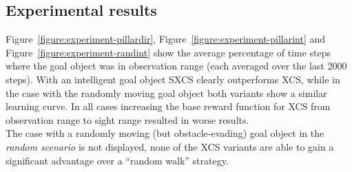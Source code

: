 
\subsection{Experimental results}\label{subsection:experimental_results}




Figure~\ref{figure:experiment-pillardir}, Figure~\ref{figure:experiment-pillarint} and Figure~\ref{figure:experiment-randint} show the average percentage of time steps where the goal object was in observation range (each averaged over the last 2000 steps). With an intelligent goal object SXCS clearly outperforms XCS, while in the case with the randomly moving goal object both variants show a similar learning curve. In all cases increasing the base reward function for XCS from observation range to sight range resulted in worse results.\\
The case with a randomly moving (but obstacle-evading) goal object in the \emph{random scenario} is not displayed, none of the XCS variants are able to gain a significant advantage over a ``random walk'' strategy.





